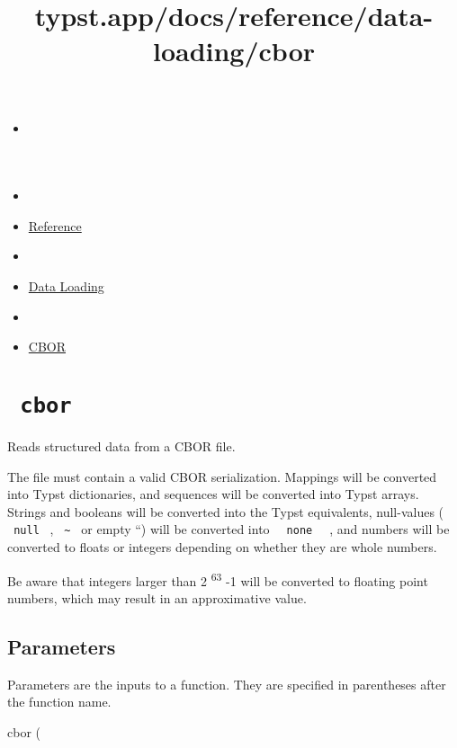 \title{typst.app/docs/reference/data-loading/cbor}

\begin{itemize}
\tightlist
\item
  \href{/docs}{}
\item
  
\item
  \href{/docs/reference/}{Reference}
\item
  
\item
  \href{/docs/reference/data-loading/}{Data Loading}
\item
  
\item
  \href{/docs/reference/data-loading/cbor/}{CBOR}
\end{itemize}

\section{\texorpdfstring{\texttt{\ cbor\ }}{ cbor }}\label{summary}

Reads structured data from a CBOR file.

The file must contain a valid CBOR serialization. Mappings will be
converted into Typst dictionaries, and sequences will be converted into
Typst arrays. Strings and booleans will be converted into the Typst
equivalents, null-values ( \texttt{\ null\ } ,
\texttt{\ \textasciitilde{}\ } or empty ``) will be converted into
\texttt{\ }{\texttt{\ none\ }}\texttt{\ } , and numbers will be
converted to floats or integers depending on whether they are whole
numbers.

Be aware that integers larger than 2 \textsuperscript{63} -1 will be
converted to floating point numbers, which may result in an
approximative value.

\subsection{\texorpdfstring{{ Parameters
}}{ Parameters }}\label{parameters}

\label{parameters-tooltip}
Parameters are the inputs to a function. They are specified in
parentheses after the function name.

{ cbor } (

